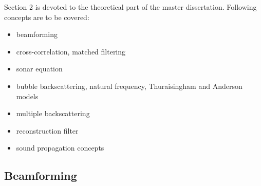 Section 2 is devoted to the theoretical part of the master dissertation. Following concepts are to be covered:
\begin{itemize}
    \item beamforming
    \item cross-correlation, matched filtering
    \item sonar equation
    \item bubble backscattering, natural frequency, Thuraisingham and Anderson models
    \item multiple backscattering
    \item reconstruction filter
    \item sound propagation concepts
\end{itemize}

\subsection{Beamforming}
